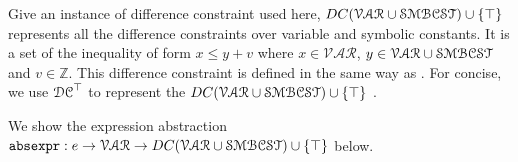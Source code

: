 Give an instance of difference constraint used here,
$DC(\mathcal{VAR}  \cup \mathcal{SMBCST}) \cup \{\top\}$ represents all the difference constraints over 
variable and symbolic constants. 
It is a set of the inequality of form $x \leq y + v$ where $x \in \mathcal{VAR} $, 
$y \in \mathcal{VAR}  \cup \mathcal{SMBCST}$ and $v \in \mathbb{Z}$. 
This difference constraint is defined in the same way as
\cite{sinn2017complexity}. For concise, we use $\mathcal{DC}^{\top}$ to represent the $DC(\mathcal{VAR}  \cup \mathcal{SMBCST}) \cup \{\top\}$ .


We show the expression abstraction $\mathtt{abs}{\mathtt{expr}} : e \to \mathcal{VAR} \to DC(\mathcal{VAR}  \cup \mathcal{SMBCST}) \cup \{\top\} $ below.





